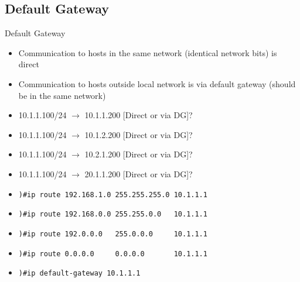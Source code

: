 \subsection{Default Gateway}
\begin{frame}{Default Gateway}
	\begin{itemize}[<+->]
		\item Communication to hosts in the same network (identical network bits) is direct
		\item Communication to hosts outside local network is via default gateway (should be in the same network)
		\item 10.1.1.100/24 $\rightarrow$ 10.1.1.200 [Direct or via DG]?
		\item 10.1.1.100/24 $\rightarrow$ 10.1.2.200 [Direct or via DG]?
		\item 10.1.1.100/24 $\rightarrow$ 10.2.1.200 [Direct or via DG]?
		\item 10.1.1.100/24 $\rightarrow$ 20.1.1.200 [Direct or via DG]?
		\item \texttt{)\#ip route 192.168.1.0 255.255.255.0 10.1.1.1}
		\item \texttt{)\#ip route 192.168.0.0 255.255.0.0~~~10.1.1.1}
		\item \texttt{)\#ip route 192.0.0.0~~~255.0.0.0~~~~~10.1.1.1}
		\item \texttt{)\#ip route 0.0.0.0~~~~~0.0.0.0~~~~~~~10.1.1.1}
		\item \texttt{)\#ip default-gateway 10.1.1.1}
	\end{itemize}
\end{frame}
